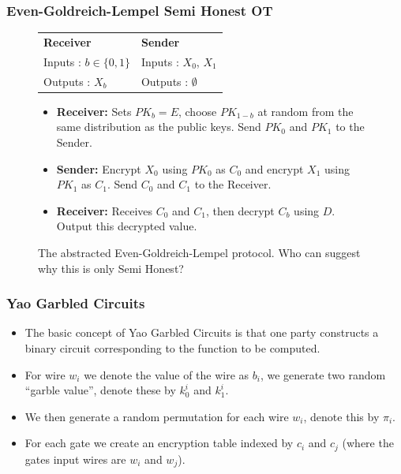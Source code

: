 \documentclass{beamer}
\begin{document}
	\begin{frame}
		\frametitle{Even-Goldreich-Lempel Semi Honest OT}
		\begin{figure}[!htb]
			\begin{tabular}[!htb]{p{6cm} p{6cm}}
				\textbf{Receiver} & \textbf{Sender}\\
				Inputs : $b \in \{0, 1\}$ & Inputs : $X_0$, $X_1$\\
				Outputs : $X_b$ & Outputs : $\emptyset$\\
			\end{tabular}

			\begin{itemize}
				\setlength{\itemsep}{0.5pt}
				\setlength{\parskip}{0pt}
				\setlength{\parsep}{0pt}

				\item \textbf{Receiver:} Sets $PK_b = E$, choose $PK_{1-b}$ at random from the same distribution as the public keys. Send $PK_0$ and $PK_1$ to the Sender.\\
				\item \textbf{Sender:} Encrypt $X_0$ using $PK_0$ as $C_0$ and encrypt $X_1$ using $PK_1$ as $C_1$. Send $C_0$ and $C_1$ to the Receiver.\\
				\item \textbf{Receiver:} Receives $C_0$ and $C_1$, then decrypt $C_b$ using $D$. Output this decrypted value.
			\end{itemize}

			\caption{The abstracted Even-Goldreich-Lempel protocol. Who can suggest why this is only Semi Honest? \label{fig:EvenGoldreichLempel}}
		\end{figure}
	\end{frame}

	\begin{frame}
		\frametitle{Yao Garbled Circuits}
		\begin{itemize}
			\item The basic concept of Yao Garbled Circuits is that one party constructs a binary circuit corresponding to the function to be computed.
			\item For wire $w_i$ we denote the value of the wire as $b_i$, we generate two random ``garble value'', denote these by $k_0^i$ and $k_1^i$.
			\item We then generate a random permutation for each wire $w_i$, denote this by $\pi_i$.
			\item For each gate we create an encryption table indexed by $c_i$ and $c_j$ (where the gates input wires are $w_i$ and $w_j$).
		\end{itemize}

	\end{frame}
\end{document}
